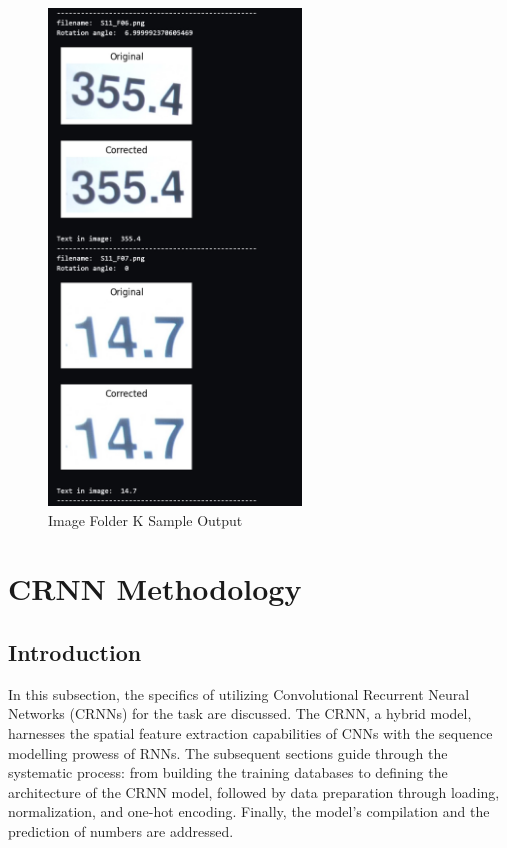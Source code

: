 \begin{figure}[ht]
    \centering
    \includegraphics[width=0.6\textwidth]{Figures/Methodology/sipa_11/sample_output.jpg}
    \caption[Image Folder K Sample Output]{Image Folder K Sample Output}
    \label{fig:Image Folder K Sample Output}
\end{figure}




\newpage

\section{CRNN Methodology}

\subsection{Introduction}

In this subsection, the specifics of utilizing Convolutional Recurrent Neural Networks (CRNNs) for the task are discussed. The CRNN, a hybrid model, harnesses the spatial feature extraction capabilities of CNNs with the sequence modelling prowess of RNNs. The subsequent sections guide through the systematic process: from building the training databases to defining the architecture of the CRNN model, followed by data preparation through loading, normalization, and one-hot encoding. Finally, the model's compilation and the prediction of numbers are addressed.



